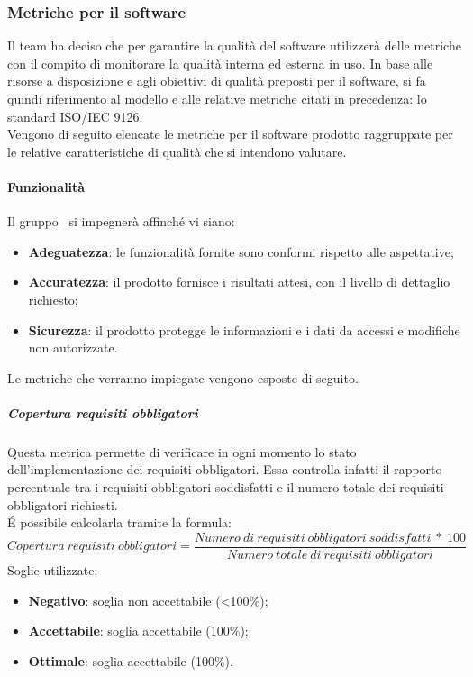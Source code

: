 \documentclass[../PianoDiQualifica.tex]{subfiles}
\begin{document}
			\subsubsection{Metriche per il software}
			Il team ha deciso che per garantire la qualità del software utilizzerà delle metriche con il compito di monitorare la qualità interna ed esterna in uso. In base alle risorse a disposizione e agli obiettivi di qualità preposti per il software, si fa quindi riferimento al modello e alle relative metriche citati in precedenza: lo standard ISO/IEC 9126.\\
			Vengono di seguito elencate le metriche per il software prodotto raggruppate per le relative caratteristiche di qualità che si intendono valutare.\\

			\paragraph{Funzionalità}
			Il gruppo \kpanic\ si impegnerà affinché vi siano:
			\begin{itemize}
				\item \textbf{Adeguatezza}: le funzionalità fornite sono conformi rispetto alle aspettative;
				\item \textbf{Accuratezza}: il prodotto fornisce i risultati attesi, con il livello di dettaglio richiesto;
				\item \textbf{Sicurezza}: il prodotto protegge le informazioni e i dati da accessi e modifiche non autorizzate.
			\end{itemize}
			Le metriche che verranno impiegate vengono esposte di seguito.

			\subparagraph{Copertura requisiti obbligatori}
			Questa metrica permette di verificare in ogni momento lo stato dell'implementazione dei requisiti obbligatori. Essa controlla infatti il rapporto percentuale tra i requisiti obbligatori soddisfatti e il numero totale dei requisiti obbligatori richiesti.\\
			É possibile calcolarla tramite la formula:
			\begin{equation*}
					Copertura \ requisiti \ obbligatori = \frac{Numero \ di \ requisiti \ obbligatori \ soddisfatti \ * \ 100}{Numero \ totale \ di \ requisiti \ obbligatori}
				\end{equation*}
				Soglie utilizzate:
				\begin{itemize}
					\item \textbf{Negativo}: soglia non accettabile (<100\%);
					\item \textbf{Accettabile}: soglia accettabile (100\%);
					\item \textbf{Ottimale}: soglia accettabile (100\%).
				\end{itemize}
\end{document}
